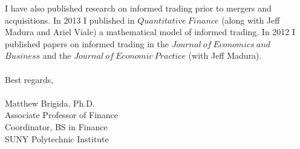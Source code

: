 \documentclass[12pt]{article}
\begin{document}
I have also published research on informed trading prior to mergers and acquisitions.  In 2013 I published in $Quantitative\ Finance$ (along with Jeff Madura and Ariel Viale) a mathematical model of informed trading.  In 2012 I published papers on informed trading in the $Journal\ of\ Economics\ and$ \\ $ Business$ and the $Journal\ of\ Economic\ Practice$ (with Jeff Madura). 
\\
\\
Best regards,\\
\\
Matthew Brigida, Ph.D.\\
Associate Professor of Finance\\
Coordinator, BS in Finance \\
SUNY Polytechnic Institute
\end{document}
